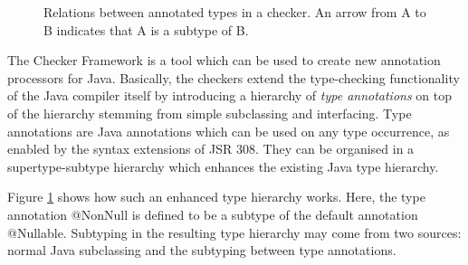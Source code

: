 \documentclass{pracamgr}
\theoremstyle{all}
\begin{document}
\begin{figure}
  \centering
  
  \caption{Relations between annotated types in a checker. An arrow from
    A to B indicates that A is a subtype of B.}
  \label{fig:example-checker-hierarchy}
\end{figure}


The Checker Framework is a tool which can be used to create new
annotation processors for Java. Basically, the checkers extend the
type-checking functionality of the Java compiler itself by introducing
a hierarchy of \emph{type annotations} on top of the hierarchy
stemming from simple subclassing and interfacing. Type annotations are
Java annotations which can be used on any type occurrence, as enabled
by the syntax extensions of JSR 308. They can be organised in a
supertype-subtype hierarchy which enhances the existing Java type
hierarchy.

Figure \ref{fig:example-checker-hierarchy} shows how such an enhanced
type hierarchy works. Here, the type annotation @NonNull is defined to
be a subtype of the default annotation @Nullable. Subtyping in the
resulting type hierarchy may come from two sources: normal Java
subclassing and the subtyping between type annotations.
\end{document}

